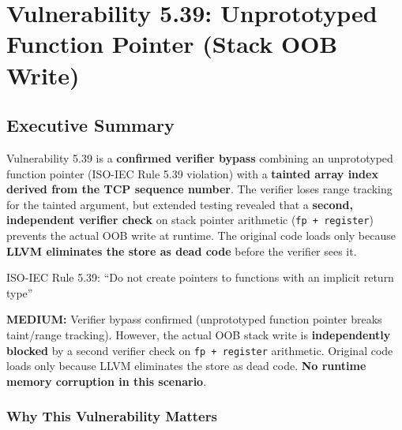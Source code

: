 \chapter{\texorpdfstring{Vulnerability 5.39: Unprototyped\\Function Pointer (Stack OOB Write)}{Vulnerability 5.39: Unprototyped Function Pointer (Stack OOB Write)}}

\section{Executive Summary}

Vulnerability 5.39 is a \textbf{confirmed verifier bypass} combining an unprototyped function pointer (ISO-IEC Rule 5.39 violation) with a \textbf{tainted array index derived from the TCP sequence number}. The verifier loses range tracking for the tainted argument, but extended testing revealed that a \textbf{second, independent verifier check} on stack pointer arithmetic (\texttt{fp + register}) prevents the actual OOB write at runtime. The original code loads only because \textbf{LLVM eliminates the store as dead code} before the verifier sees it.

\begin{tcolorbox}[colback=blue!5!white,colframe=blue!75!black,title=ISO Rule Violated,fonttitle=\bfseries]
ISO-IEC Rule 5.39: ``Do not create pointers to functions with an implicit return type''
\end{tcolorbox}

\begin{tcolorbox}[colback=red!5!white,colframe=red!75!black,title=Severity,fonttitle=\bfseries]
\textbf{MEDIUM:} Verifier bypass confirmed (unprototyped function pointer breaks taint/range tracking). However, the actual OOB stack write is \textbf{independently blocked} by a second verifier check on \texttt{fp + register} arithmetic. Original code loads only because LLVM eliminates the store as dead code. \textbf{No runtime memory corruption in this scenario}.
\end{tcolorbox}

\subsection{Why This Vulnerability Matters}

